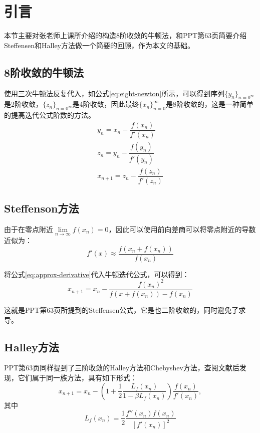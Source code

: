 
\section{引言}

本节主要对张老师上课所介绍的构造8阶收敛的牛顿法，和PPT第63页简要介绍Steffensen和Halley方法做一个简要的回顾，作为本文的基础。

\subsection{8阶收敛的牛顿法}

使用三次牛顿法反复代入，如公式\ref{eq:eight-newton}所示，可以得到序列$\{y_n\}_{n=0^\infty}$是2阶收敛，$\{z_n\}_{n=0^\infty}$是4阶收敛，因此最终$\{x_n\}_{n=0}^{\infty}$是8阶收敛的，这是一种简单的提高迭代公式阶数的方法。
\begin{equation}
    \label{eq:eight-newton}
    \begin{aligned}
        y_n = x_n - \dfrac{f(x_n)}{f'(x_n)}\\
        z_n = y_n - \dfrac{f(y_n)}{f'(y_n)}\\
        x_{n+1} = z_n - \dfrac{f(z_n)}{f'(z_n)}
    \end{aligned}
\end{equation}


\subsection{Steffenson方法}

由于在零点附近$\lim\limits_{n\to \infty}f(x_n)=0$，因此可以使用前向差商可以将零点附近的导数近似为：
\begin{equation}
    \label{eq:approx-derivative}
    f'(x)\approx \dfrac{f(x_n+f(x_n))}{f(x_n)}
\end{equation}

将公式\ref{eq:approx-derivative}代入牛顿迭代公式，可以得到：
\begin{equation}
    \label{eq:newton-nodev}
    x_{n+1}=x_n-\dfrac{f(x_n)^2}{f(x+f(x_n))-f(x_n)}
\end{equation}

这就是PPT第63页所提到的Steffensen公式，它是也二阶收敛的\cite{jain2007steffensen}，同时避免了求导。

\subsection{Halley方法}

PPT第63页同样提到了三阶收敛的Halley方法和Chebyshev方法，查阅文献\cite{gutierrez1997family}后发现，它们属于同一族方法，具有如下形式：
\begin{equation}
    \label{eq:real-halley}
    x_{n+1} = x_n-\left( 1 + \dfrac{1}{2}\dfrac{L_f(x_n)}{1-\beta L_f(x_n)} \right) \dfrac{f(x_n)}{f'(x_n)},
\end{equation}
其中
\begin{equation}
    L_f(x_n) = \dfrac{1}{2}\dfrac{f''(x_n)f(x_n)}{[f'(x_n)]^2}
\end{equation}

